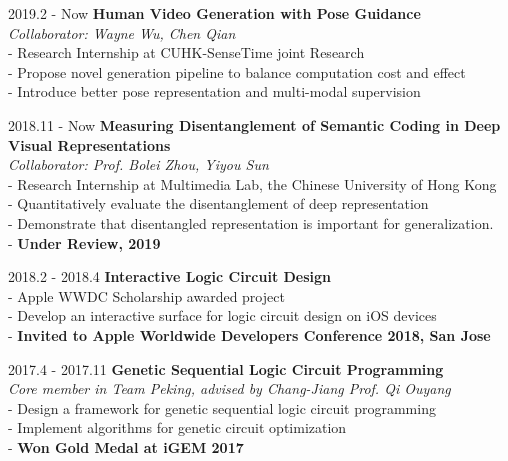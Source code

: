 \documentclass{academiccv}
\begin{document}
\begin{tablist}

\item[2019.2 - Now] 	\tab \textbf {Human Video Generation with Pose Guidance} \textbf
					\\ \tab \emph{Collaborator: Wayne Wu, Chen Qian}\emph
				    \\ \tab - Research Internship at CUHK-SenseTime joint Research
				     \\ \tab - Propose novel generation pipeline to balance computation cost and effect
				     \\ \tab - Introduce better pose representation and multi-modal supervision	

\item[2018.11 - Now] 	\tab \textbf {Measuring Disentanglement of Semantic Coding in Deep Visual Representations} \textbf
					\\ \tab \emph{Collaborator: Prof. Bolei Zhou, Yiyou Sun}\emph
					\\ \tab - Research Internship at Multimedia Lab, the Chinese University of Hong Kong
				      \\ \tab - Quantitatively evaluate the disentanglement of deep representation
				      \\ \tab - Demonstrate that disentangled representation is important for generalization.
				      \\ \tab - \textbf{Under Review, 2019}
				   			     
				     
\item[2018.2 - 2018.4] 	\tab \textbf {Interactive Logic Circuit Design} \textbf
					\\ \tab - Apple WWDC Scholarship awarded project
				    \\ \tab - Develop an interactive surface for logic circuit design on iOS devices
				    \\ \tab - \textbf{Invited to Apple Worldwide Developers Conference 2018, San Jose}

\item[2017.4 - 2017.11] 	\tab \textbf {Genetic Sequential Logic Circuit Programming} \textbf
					\\ \tab \emph{Core member in Team Peking, advised by Chang-Jiang Prof. Qi Ouyang}\emph
					\\ \tab - Design a framework for genetic sequential logic circuit programming
				    \\ \tab - Implement algorithms for genetic circuit optimization
				    \\ \tab - \textbf{Won Gold Medal at iGEM 2017}		    
				     				     			     				      
\end{tablist}
\end{document}
